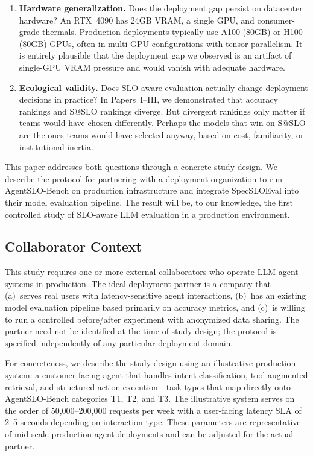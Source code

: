 \documentclass[11pt]{article}
\makeatletter
\newcommand{\sslo}{\ensuremath{\mathrm{S@SLO}}}
\makeatother
\begin{document}
\begin{enumerate}[leftmargin=16pt]
    \item \textbf{Hardware generalization.} Does the deployment gap persist on datacenter hardware? An RTX~4090 has 24GB VRAM, a single GPU, and consumer-grade thermals. Production deployments typically use A100 (80GB) or H100 (80GB) GPUs, often in multi-GPU configurations with tensor parallelism. It is entirely plausible that the deployment gap we observed is an artifact of single-GPU VRAM pressure and would vanish with adequate hardware.

    \item \textbf{Ecological validity.} Does SLO-aware evaluation actually change deployment decisions in practice? In Papers~I--III, we demonstrated that accuracy rankings and $\sslo{}$ rankings diverge. But divergent rankings only matter if teams would have chosen differently. Perhaps the models that win on $\sslo{}$ are the ones teams would have selected anyway, based on cost, familiarity, or institutional inertia.
\end{enumerate}

This paper addresses both questions through a concrete study design. We describe the protocol for partnering with a deployment organization to run AgentSLO-Bench on production infrastructure and integrate SpecSLOEval into their model evaluation pipeline. The result will be, to our knowledge, the first controlled study of SLO-aware LLM evaluation in a production environment.

\subsection{Collaborator Context}

This study requires one or more external collaborators who operate LLM agent systems in production. The ideal deployment partner is a company that (a)~serves real users with latency-sensitive agent interactions, (b)~has an existing model evaluation pipeline based primarily on accuracy metrics, and (c)~is willing to run a controlled before/after experiment with anonymized data sharing. The partner need not be identified at the time of study design; the protocol is specified independently of any particular deployment domain.

For concreteness, we describe the study design using an illustrative production system: a customer-facing agent that handles intent classification, tool-augmented retrieval, and structured action execution---task types that map directly onto AgentSLO-Bench categories T1, T2, and T3. The illustrative system serves on the order of 50,000--200,000 requests per week with a user-facing latency SLA of 2--5 seconds depending on interaction type. These parameters are representative of mid-scale production agent deployments and can be adjusted for the actual partner.
\end{document}
